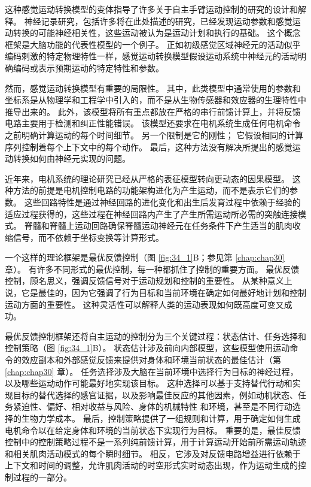 这种感觉运动转换模型的变体指导了许多关于自主手臂运动控制的研究的设计和解释。
神经记录研究，包括许多将在此处描述的研究，已经发现运动参数和感觉运动转换的可能神经相关性，这些运动被认为是运动计划和执行的基础。 
这个概念框架是大脑功能的代表性模型的一个例子。 
正如初级感觉区域神经元的活动似乎编码刺激的特定物理特性一样，感觉运动转换模型假设运动系统中神经元的活动明确编码或表示预期运动的特定特性和参数。


然而，感觉运动转换模型有重要的局限性。 其中，此类模型中通常使用的参数和坐标系是从物理学和工程学中引入的，而不是从生物传感器和效应器的生理特性中推导出来的。 此外，该模型将所有重点都放在严格的串行前馈计算上，并将反馈电路主要用于检测和纠正性能错误。 该模型还要求在电机系统生成任何电机命令之前明确计算运动的每个时间细节。 另一个限制是它的刚性； 它假设相同的计算序列控制着每个上下文中的每个动作。 最后，这种方法没有解决所提出的感觉运动转换如何由神经元实现的问题。

近年来，电机系统的理论研究已经从严格的表征模型转向更动态的因果模型。 这种方法的前提是电机控制电路的功能架构进化为产生运动，而不是表示它们的参数。 这些回路特性是通过神经回路的进化变化和出生后发育过程中依赖于经验的适应过程获得的，这些过程在神经回路内产生了产生所需运动所必需的突触连接模式。 脊髓和脊髓上运动回路确保脊髓运动神经元在任务条件下产生适当的肌肉收缩信号，而不依赖于坐标变换等计算形式。

一个这样的理论框架是最优反馈控制（图 \ref{fig:34_1}B；参见第 \ref{chap:chap30} 章）。 有许多不同形式的最优控制，每一种都抓住了控制的重要方面。 最优反馈控制，顾名思义，强调反馈信号对于运动规划和控制的重要性。 从某种意义上说，它是最佳的，因为它强调了行为目标和当前环境在确定如何最好地计划和控制运动方面的重要性。 这种灵活性可以解释人类的运动表现如何既高度可变又成功。

最优反馈控制框架还将自主运动的控制分为三个关键过程：状态估计、任务选择和控制策略（图 \ref{fig:34_1}B）。 状态估计涉及前向内部模型，这些模型使用运动命令的效应副本和外部感觉反馈来提供对身体和环境当前状态的最佳估计（第 \ref{chap:chap30} 章）。 任务选择涉及大脑在当前环境中选择行为目标的神经过程，以及哪些运动动作可能最好地实现该目标。 这种选择可以基于支持替代行动和实现目标的替代选择的感官证据，以及影响最佳反应的其他因素，例如动机状态、任务紧迫性、偏好、相对收益与风险、身体的机械特性 和环境，甚至是不同行动选择的生物力学成本。 最后，控制策略提供了一组规则和计算，用于确定如何生成电机命令以在给定身体和环境的当前状态下实现行为目标。 重要的是，最佳反馈控制中的控制策略过程不是一系列纯前馈计算，用于计算运动开始前所需运动轨迹和相关肌肉活动模式的每个瞬时细节。 相反，它涉及对反馈电路增益进行依赖于上下文和时间的调整，允许肌肉活动的时空形式实时动态出现，作为运动生成的控制过程的一部分。


